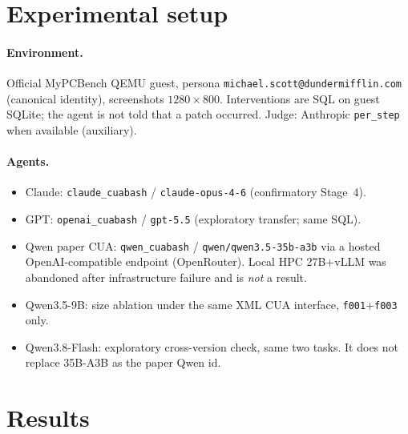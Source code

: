 \documentclass[11pt]{article}
\newcommand{\task}[1]{\texttt{#1}}
\begin{document}
\section{Experimental setup}

\paragraph{Environment.}
Official MyPCBench QEMU guest, persona
\texttt{michael.scott@dundermifflin.com} (canonical identity),
screenshots $1280\times 800$.
Interventions are SQL on guest SQLite; the agent is not told that a
patch occurred. Judge: Anthropic \texttt{per\_step} when available
(auxiliary).

\paragraph{Agents.}
\begin{itemize}[leftmargin=1.3em,itemsep=0.2em]
  \item Claude: \texttt{claude\_cuabash} / \texttt{claude-opus-4-6}
        (confirmatory Stage~4).
  \item GPT: \texttt{openai\_cuabash} / \texttt{gpt-5.5}
        (exploratory transfer; same SQL).
  \item Qwen paper CUA: \texttt{qwen\_cuabash} /
        \texttt{qwen/qwen3.5-35b-a3b} via a hosted OpenAI-compatible
        endpoint (OpenRouter). Local HPC 27B+vLLM was abandoned after
        infrastructure failure and is \emph{not} a result.
  \item Qwen3.5-9B: size ablation under the same XML CUA interface,
        \task{f001}+\task{f003} only.
  \item Qwen3.8-Flash: exploratory cross-version check, same two tasks.
        It does not replace 35B-A3B as the paper Qwen id.
\end{itemize}

\section{Results}
\end{document}
